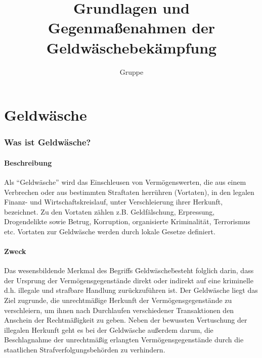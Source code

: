 \documentclass{article}
\begin{document}
\title{Grundlagen und Gegenmaßenahmen der Geldwäschebekämpfung}
\author{Gruppe}
\maketitle

\tableofcontents

\newpage

\part[Geldwäsche]{Geldwäsche}

    \section[Was ist Geldwäsche?]{Was ist Geldwäsche?}
            
        \subsection[Beschreibung]{Beschreibung}

            Als “Geldwäsche” wird das Einschleusen von Vermögenswerten, die aus einem Verbrechen oder aus bestimmten Straftaten herrühren (Vortaten), in den legalen Finanz- und Wirtschaftskreislauf, unter Verschleierung ihrer Herkunft, bezeichnet. Zu den Vortaten zählen z.B. Geldfälschung, Erpressung, Drogendelikte sowie Betrug, Korruption, organisierte Kriminalität, Terrorismus etc. Vortaten zur Geldwäsche werden durch lokale Gesetze definiert.
        
        \subsection[Zweck]{Zweck}

            Das wesensbildende Merkmal des Begriffs \"Geldwäsche\" besteht folglich darin, dass der Ursprung der Vermögensgegenstände direkt oder indirekt auf eine kriminelle d.h. illegale und strafbare Handlung zurückzuführen ist.
            Der Geldwäsche liegt das Ziel zugrunde, die unrechtmäßige Herkunft der Vermögensgegenstände zu verschleiern, um ihnen nach Durchlaufen verschiedener Transaktionen den Anschein der Rechtmäßigkeit zu geben. 
            Neben der bewussten Vertuschung der illegalen Herkunft geht es bei der Geldwäsche außerdem darum, die Beschlagnahme der unrechtmäßig erlangten Vermögensgegenstände durch die staatlichen Strafverfolgungsbehörden zu verhindern.
\end{document}
